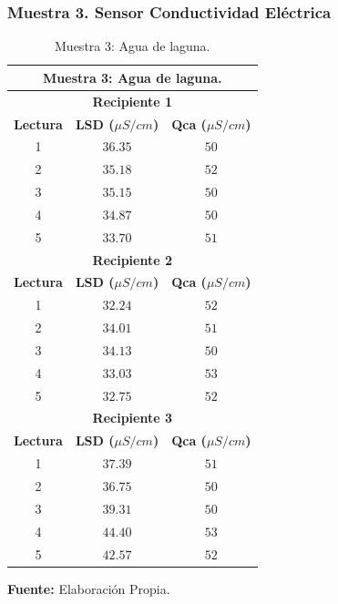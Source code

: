 \subsubsection{Muestra 3. Sensor Conductividad El\'ectrica}
  \begin{table}[H]
        \protect\caption[Muestra 3: Agua de laguna]{Muestra 3: Agua de laguna.}
        \label{tab:CEMuestra3}
        \centering
        \begin{tabular}{c c c}
            \hline
            \multicolumn{3}{c}{\textbf{Muestra 3: Agua de laguna.}} \\
             \hline
            \multicolumn{3}{c}{\textbf{Recipiente 1}} \\
            \hline
            \textbf{Lectura}&\textbf{LSD ($\mu S/cm$)}&\textbf{Qca ($\mu S/cm$)} \\
            \hline
            {1}& $36.35$&$50$ \\ 
            {2}& $35.18$&$52$ \\ 
            {3}& $35.15$&$50$ \\  
            {4}& $34.87$&$50$ \\ 
            {5}& $33.70$&$51$ \\
            \hline
            \multicolumn{3}{c}{\textbf{Recipiente 2}} \\
            \hline
            \textbf{Lectura}&\textbf{LSD ($\mu S/cm$)}&\textbf{Qca ($\mu S/cm$)} \\
            \hline
            {1}& $32.24$&$52$ \\ 
            {2}& $34.01$&$51$ \\ 
            {3}& $34.13$&$50$ \\  
            {4}& $33.03$&$53$ \\ 
            {5}& $32.75$&$52$ \\
            \hline
            \multicolumn{3}{c}{\textbf{Recipiente 3}} \\
            \hline
            \textbf{Lectura}&\textbf{LSD ($\mu S/cm$)}&\textbf{Qca ($\mu S/cm$)} \\
            \hline
            {1}& $37.39$&$51$ \\ 
            {2}& $36.75$&$50$ \\ 
            {3}&$39.31$&$50$\\  
            {4}& $44.40$&$53$\\ 
            {5}& $42.57$&$52$ \\
            \hline
        \end{tabular}
        \vspace{5mm}
        \newline
        \hfill \textbf{Fuente: }Elaboración Propia.
    \end{table}

